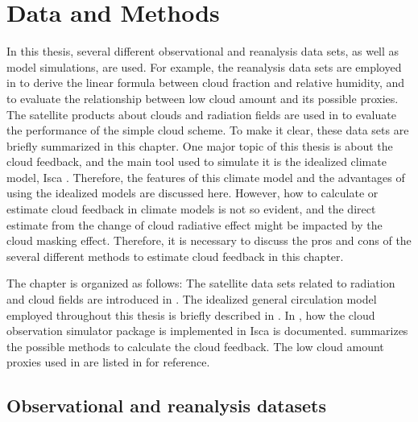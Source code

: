 \chapter{Data and Methods}
\label{ch:methods}

In this thesis, several different observational and reanalysis data sets, as well as model simulations, are used. For example, the reanalysis data sets are employed in  to derive the linear formula between cloud fraction and relative humidity, and to evaluate the relationship between low cloud amount and its possible proxies. The satellite products about clouds and radiation fields are used in  to evaluate the performance of the simple cloud scheme. To make it clear, these data sets are briefly summarized in this chapter. One major topic of this thesis is about the cloud feedback, and the main tool used to simulate it is the idealized climate model, Isca \citep{Vallis2018}. Therefore, the features of this climate model and the advantages of using the idealized models are discussed here. However, how to calculate or estimate cloud feedback in climate models is not so evident, and the direct estimate from the change of cloud radiative effect might be impacted by the cloud masking effect. Therefore, it is necessary to discuss the pros and cons of the several different methods to estimate cloud feedback in this chapter. %

The chapter is organized as follows: The satellite data sets related to radiation and cloud fields are introduced in . The idealized general circulation model employed throughout this thesis is briefly described in . In , how the cloud observation simulator package is implemented in Isca is documented.  summarizes the possible methods to calculate the cloud feedback. The low cloud amount proxies used in  are listed in  for reference.

\section{Observational and reanalysis datasets}
\label{sec:obs_reanalysis_dataset}

